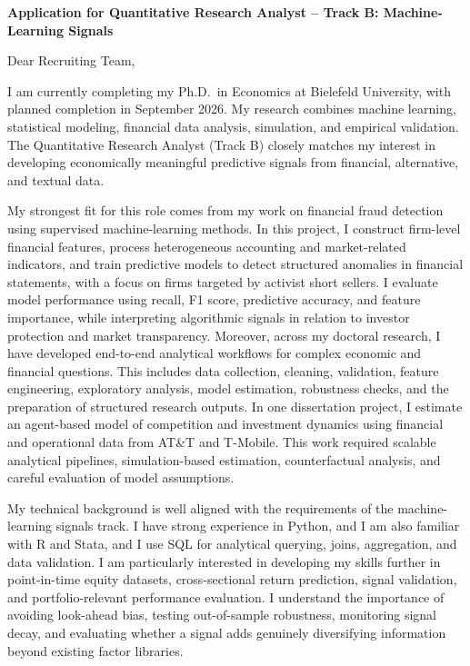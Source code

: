 \documentclass[11pt]{article}
\begin{document}
\vspace{0.1cm}

\noindent
\textbf{Application for Quantitative Research Analyst -- Track B: Machine-Learning Signals} \\

\vspace{0.05cm}

\noindent Dear Recruiting Team,

I am currently completing my Ph.D.\ in Economics at Bielefeld University, with planned completion in September 2026. My research combines machine learning, statistical modeling, financial data analysis, simulation, and empirical validation. The Quantitative Research Analyst (Track B) closely matches my interest in developing economically meaningful predictive signals from financial, alternative, and textual data.

My strongest fit for this role comes from my work on financial fraud detection using supervised machine-learning methods. In this project, I construct firm-level financial features, process heterogeneous accounting and market-related indicators, and train predictive models to detect structured anomalies in financial statements, with a focus on firms targeted by activist short sellers. I evaluate model performance using recall, F1 score, predictive accuracy, and feature importance, while interpreting algorithmic signals in relation to investor protection and market transparency. 
Moreover, across my doctoral research, I have developed end-to-end analytical workflows for complex economic and financial questions. This includes data collection, cleaning, validation, feature engineering, exploratory analysis, model estimation, robustness checks, and the preparation of structured research outputs. In one dissertation project, I estimate an agent-based model of competition and investment dynamics using financial and operational data from AT\&T and T-Mobile. This work required scalable analytical pipelines, simulation-based estimation, counterfactual analysis, and careful evaluation of model assumptions. 

My technical background is well aligned with the requirements of the machine-learning signals track. I have strong experience in Python, and I am also familiar with R and Stata, and I use SQL for analytical querying, joins, aggregation, and data validation. I am particularly interested in developing my skills further in point-in-time equity datasets, cross-sectional return prediction, signal validation, and portfolio-relevant performance evaluation. I understand the importance of avoiding look-ahead bias, testing out-of-sample robustness, monitoring signal decay, and evaluating whether a signal adds genuinely diversifying information beyond existing factor libraries.
\end{document}
